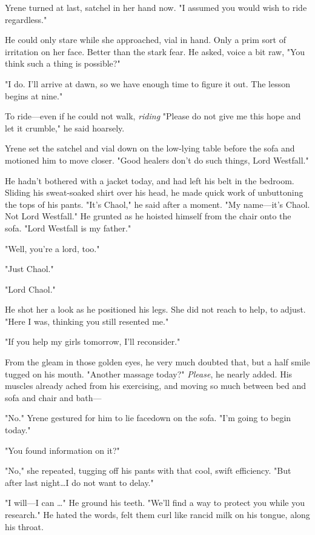 Yrene turned at last, satchel in her hand now.
"I assumed you would wish to ride regardless."

He could only stare while she approached, vial in hand.
Only a prim sort of irritation on her face.
Better than the stark fear.
He asked, voice a bit raw, "You think such a thing is possible?"

"I do.
I'll arrive at dawn, so we have enough time to figure it out.
The lesson begins at nine."

To ride---even if he could not walk, \emph{riding}  "Please do not give me this hope and let it crumble," he said hoarsely.

Yrene set the satchel and vial down on the low-lying table before the sofa and motioned him to move closer.
"Good healers don't do such things, Lord Westfall."

He hadn't bothered with a jacket today, and had left his belt in the bedroom.
Sliding his sweat-soaked shirt over his head, he made quick work of unbuttoning the tops of his pants.
"It's Chaol," he said after a moment.
"My name---it's Chaol.
Not Lord Westfall."
He grunted as he hoisted himself from the chair onto the sofa.
"Lord Westfall is my father."

"Well, you're a lord, too."

"Just Chaol."

"Lord Chaol."

He shot her a look as he positioned his legs.
She did not reach to help, to adjust.
"Here I was, thinking you still resented me."

"If you help my girls tomorrow, I'll reconsider."

From the gleam in those golden eyes, he very much doubted that, but a half smile tugged on his mouth.
"Another massage today?"
\emph{Please}, he nearly added.
His muscles already ached from his exercising, and moving so much between bed and sofa and chair and bath---

"No."
Yrene gestured for him to lie facedown on the sofa.
"I'm going to begin today."

"You found information on it?"

"No," she repeated, tugging off his pants with that cool, swift efficiency.
"But after last night\ldots I do not want to delay."

"I will---I can \ldots" He ground his teeth.
"We'll find a way to protect you while you research."
He hated the words, felt them curl like rancid milk on his tongue, along his throat.

